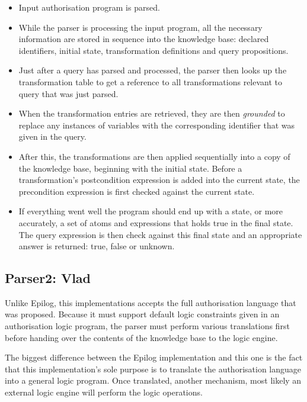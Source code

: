 \documentclass[a4paper]{article}
\begin{document}
        \begin{itemize}
          \item
            Input authorisation program is parsed.
          \item
            While the parser is processing the input program, all the
            necessary information are stored in sequence into the knowledge
            base: declared identifiers, initial state, transformation
            definitions and query propositions.
          \item
            Just after a query has parsed and processed, the parser then
            looks up the transformation table to get a reference to all
            transformations relevant to query that was just parsed.
          \item
            When the transformation entries are retrieved, they are then
            \emph{grounded} to replace any instances of variables with
            the corresponding identifier that was given in the query.
          \item
            After this, the transformations are then applied sequentially
            into a copy of the knowledge base, beginning with the initial
            state. Before a transformation's postcondition expression is added
            into the current state, the precondition expression is first
            checked against the current state.
          \item
            If everything went well the program should end up with a state,
            or more accurately, a set of atoms and expressions that holds
            true in the final state. The query expression is then check
            against this final state and an appropriate answer is returned:
            true, false or unknown.
            
        \end{itemize}

    \subsection{Parser2: Vlad}

      Unlike Epilog, this implementations accepts the full authorisation
      language that was proposed. Because it must support default logic
      constraints given in an authorisation logic program, the parser must
      perform various translations first before handing over the contents
      of the knowledge base to the logic engine.

      The biggest difference between the Epilog implementation and this one
      is the fact that this implementation's sole purpose is to translate
      the authorisation language into a general logic program. Once translated,
      another mechanism, most likely an external logic engine will perform
      the logic operations.
\end{document}
